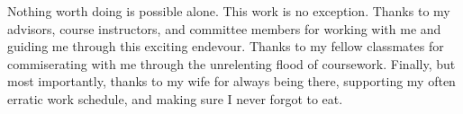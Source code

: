\begin{acknowledgements}
Nothing worth doing is possible alone.  This work is no exception.  Thanks to
my advisors, course instructors, and committee members for working with me and
guiding me through this exciting endevour.  Thanks to my fellow classmates for
commiserating with me through the unrelenting flood of coursework.  Finally,
but most importantly, thanks to my wife for always being there, supporting my
often erratic work schedule, and making sure I never forgot to eat.  
\end{acknowledgements}
